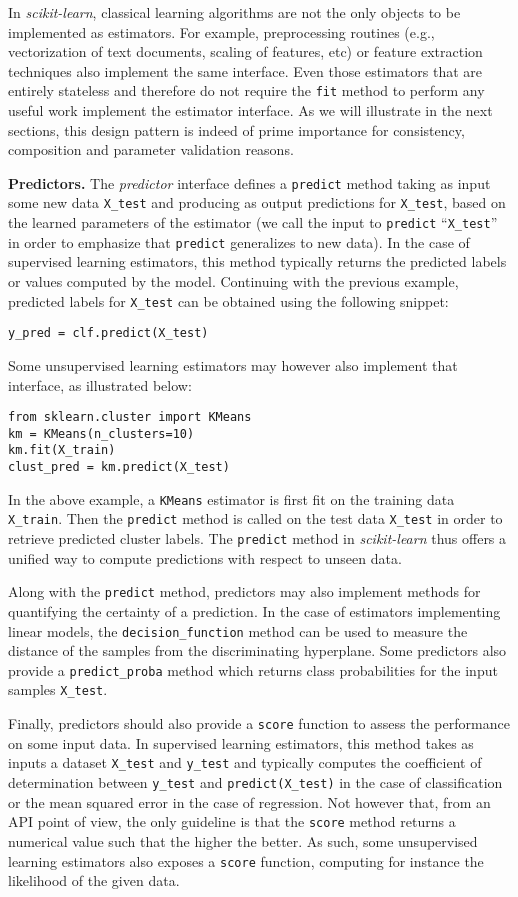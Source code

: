 \documentclass{llncs}
\newcommand{\sklearn}{\textit{scikit-learn}\xspace}
\begin{document}
In \sklearn, classical learning algorithms are not the only objects
to be implemented as estimators. For example, preprocessing routines (e.g.,
vectorization of text documents, scaling of features, etc) or feature
extraction techniques also implement the same interface. Even those estimators
that are entirely stateless and therefore do not require the \texttt{fit} method
to perform any useful work implement the estimator interface. As we will
illustrate in the next sections, this design pattern is indeed of prime
importance for consistency, composition and parameter validation reasons.

\textbf{Predictors.} The \textit{predictor} interface defines a \texttt{predict}
method taking as input some new data \texttt{X\_test} and producing as output
predictions for \texttt{X\_test}, based on the learned parameters of the
estimator (we call the input to \texttt{predict} ``\texttt{X\_test}'' in order
to emphasize that \texttt{predict} generalizes to new data). In the case of
supervised learning estimators, this method typically returns the predicted
labels or values computed by the model.  Continuing with the previous example,
predicted labels for \texttt{X\_test} can be obtained using the following
snippet:
\begin{verbatim}
y_pred = clf.predict(X_test)
\end{verbatim}
Some unsupervised learning
estimators may however also implement that interface, as illustrated below:
\begin{verbatim}
from sklearn.cluster import KMeans
km = KMeans(n_clusters=10)
km.fit(X_train)
clust_pred = km.predict(X_test)
\end{verbatim}
In the above example, a \texttt{KMeans} estimator is first fit on the training
data \texttt{X\_train}. Then the \texttt{predict} method is called on the test
data \texttt{X\_test} in order to retrieve predicted cluster labels.
The \texttt{predict} method in \sklearn thus offers a unified way
to compute predictions with respect to unseen data.

Along with the \texttt{predict} method, predictors may also implement methods
for quantifying the certainty of a prediction. In the case of estimators
implementing linear models, the \texttt{decision\_function} method can be used
to measure the distance of the samples from the discriminating hyperplane. Some
predictors also provide a \texttt{predict\_proba} method which returns
class probabilities for the input samples \texttt{X\_test}.

Finally, predictors should also provide a \texttt{score} function to assess the
performance on some input data. In supervised learning estimators, this method
takes as inputs a dataset \texttt{X\_test} and \texttt{y\_test} and typically
computes the coefficient of determination between \texttt{y\_test} and
\texttt{predict(X\_test)} in the case of classification or the mean squared
error in the case of regression. Not however that, from an API point of view,
the only guideline is that the \texttt{score} method returns a numerical value
such that the higher the better. As such, some unsupervised learning estimators
also exposes a \texttt{score} function, computing for instance the likelihood of
the given data.
\end{document}
